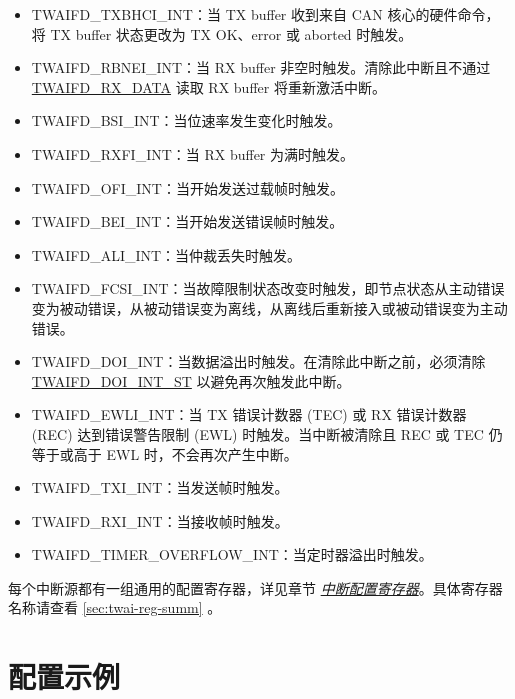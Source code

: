 \documentclass[main\_\_CN.tex]{subfiles}
\begin{document}
\begin{itemize}
    \item \label{int:TWAIFDTXBHCIINT}TWAIFD\_TXBHCI\_INT：当 TX buffer 收到来自 CAN 核心的硬件命令，将 TX buffer 状态更改为 TX OK、error 或 aborted 时触发。
    \item \label{int:TWAIFDRBNEIINT}TWAIFD\_RBNEI\_INT：当 RX buffer 非空时触发。清除此中断且不通过 \hyperref[regdesc:TWAIFDRXDATAREG]{TWAIFD\_RX\_DATA} 读取 RX buffer 将重新激活中断。
    \item \label{int:TWAIFDBSIINT}TWAIFD\_BSI\_INT：当位速率发生变化时触发。
    \item \label{int:TWAIFDRXFIINT}TWAIFD\_RXFI\_INT：当 RX buffer 为满时触发。
    \item \label{int:TWAIFDOFIINT}TWAIFD\_OFI\_INT：当开始发送过载帧时触发。
    \item \label{int:TWAIFDBEIINT}TWAIFD\_BEI\_INT：当开始发送错误帧时触发。
    \item \label{int:TWAIFDALIINT}TWAIFD\_ALI\_INT：当仲裁丢失时触发。
     \item \label{int:TWAIFDFCSIINT}TWAIFD\_FCSI\_INT：当故障限制状态改变时触发，即节点状态从主动错误变为被动错误，从被动错误变为离线，从离线后重新接入或被动错误变为主动错误。
    \item \label{int:TWAIFDDOIINT}TWAIFD\_DOI\_INT：当数据溢出时触发。在清除此中断之前，必须清除 \hyperref[fielddesc:TWAIFDDOIINTST]{TWAIFD\_DOI\_INT\_ST} 以避免再次触发此中断。
    \item \label{int:TWAIFDEWLIINT}TWAIFD\_EWLI\_INT：当 TX 错误计数器 (TEC) 或 RX 错误计数器 (REC) 达到错误警告限制 (EWL) 时触发。当中断被清除且 REC 或 TEC 仍等于或高于 EWL 时，不会再次产生中断。
    \item \label{int:TWAIFDTXIINT}TWAIFD\_TXI\_INT：当发送帧时触发。
    \item \label{int:TWAIFDRXIINT}TWAIFD\_RXI\_INT：当接收帧时触发。
    \item \label{int:TWAIFDTIMEROVERFLOWINT}TWAIFD\_TIMER\_OVERFLOW\_INT：当定时器溢出时触发。
\end{itemize}

每个中断源都有一组通用的配置寄存器，详见章节 \hyperref[interrupt-config-registers]{\textit{中断配置寄存器}}。具体寄存器名称请查看 \ref{sec:twai-reg-summ} \textit{}。



\section{配置示例}
\label{sec:twai-prog-procedures}
\end{document}
